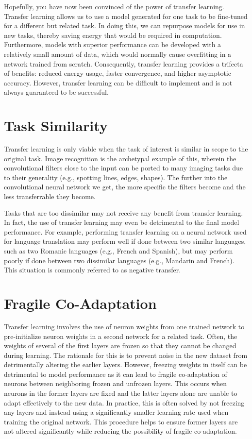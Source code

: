 Hopefully, you have now been convinced of the power of transfer learning. Transfer learning allows us to use a model generated for one task to be fine-tuned for a different but related task. In doing this, we can repurpose models for use in new tasks, thereby saving energy that would be required in computation. Furthermore, models with superior performance can be developed with a relatively small amount of data, which would normally cause overfitting in a network trained from scratch. Consequently, transfer learning provides a trifecta of benefits: reduced energy usage, faster convergence, and higher asymptotic accuracy. However, transfer learning can be difficult to implement and is not always guaranteed to be successful.

\section{Task Similarity}

Transfer learning is only viable when the task of interest is similar in scope to the original task. Image recognition is the archetypal example of this, wherein the convolutional filters close to the input can be ported to many imaging tasks due to their generality (e.g., spotting lines, edges, shapes). The further into the convolutional neural network we get, the more specific the filters become and the less transferrable they become. 

Tasks that are too dissimilar may not receive any benefit from transfer learning. In fact, the use of transfer learning may even be detrimental to the final model performance. For example, performing transfer learning on a neural network used for language translation may perform well if done between two similar languages, such as two Romanic languages (e.g., French and Spanish), but may perform poorly if done between two dissimilar languages (e.g., Mandarin and French). This situation is commonly referred to as negative transfer.

\section{Fragile Co-Adaptation}

Transfer learning involves the use of neuron weights from one trained network to pre-initialize neuron weights in a second network for a related task. Often, the weights of several of the first layers are frozen so that they cannot be changed during learning. The rationale for this is to prevent noise in the new dataset from detrimentally altering the earlier layers. However, freezing weights in itself can be detrimental to model performance as it can lead to fragile co-adaptation of neurons between neighboring frozen and unfrozen layers. This occurs when neurons in the former layers are fixed and the latter layers alone are unable to adapt effectively to the new data. In practice, this is often solved by not freezing any layers and instead using a significantly smaller learning rate used when training the original network. This procedure helps to ensure former layers are not altered significantly while reducing the possibility of fragile co-adaptation.

